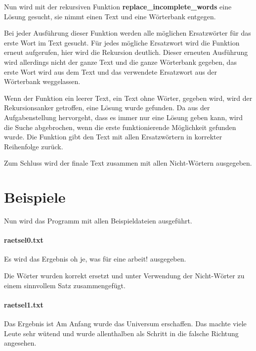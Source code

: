 \documentclass[a4paper,10pt,ngerman]{scrartcl}
\begin{document}
Nun wird mit der rekursiven Funktion \textbf{replace\_incomplete\_words} eine Lösung gesucht, sie nimmt einen Text und eine Wörterbank entgegen.

Bei jeder Ausführung dieser Funktion werden alle möglichen Ersatzwörter für das erste Wort im Text gesucht.
Für jedes mögliche Ersatzwort wird die Funktion erneut aufgerufen, hier wird die Rekursion deutlich.
Dieser erneuten Ausführung wird allerdings nicht der ganze Text und die ganze Wörterbank gegeben, das erste Wort wird aus dem Text und das verwendete Ersatzwort aus der Wörterbank weggelassen.

Wenn der Funktion ein leerer Text, ein Text ohne Wörter, gegeben wird, wird der Rekursionsanker getroffen, eine Lösung wurde gefunden.
Da aus der Aufgabenstellung hervorgeht, dass es immer nur eine Lösung geben kann, wird die Suche abgebrochen, wenn die erste funktionierende Möglichkeit gefunden wurde.
Die Funktion gibt den Text mit allen Ersatzwörtern in korrekter Reihenfolge zurück.

Zum Schluss wird der finale Text zusammen mit allen Nicht-Wörtern ausgegeben.

\section{Beispiele}

Nun wird das Programm mit allen Beispieldateien ausgeführt.

\paragraph{raetsel0.txt}
Es wird das Ergebnis \glqq oh je, was für eine arbeit!\grqq{} ausgegeben.

Die Wörter wurden korrekt ersetzt und unter Verwendung der Nicht-Wörter zu einem sinnvollem Satz zusammengefügt.

\paragraph{raetsel1.txt}
Das Ergebnis ist \glqq Am Anfang wurde das Universum erschaffen.
Das machte viele Leute sehr wütend und wurde allenthalben als Schritt in die falsche Richtung angesehen.\grqq{}
\end{document}
